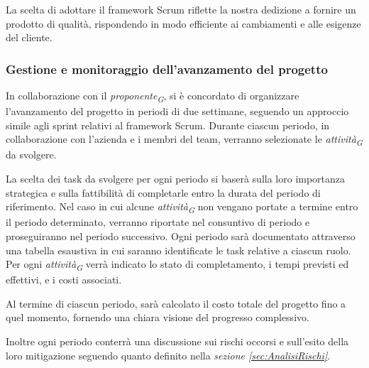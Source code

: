 La scelta di adottare il framework Scrum riflette la nostra dedizione a fornire un prodotto di qualità, rispondendo in modo efficiente ai cambiamenti e alle esigenze del cliente.

\pagebreak

\subsubsection{Gestione e monitoraggio dell'avanzamento del progetto}
In collaborazione con il \textit{proponente}\textsubscript{\textit{G}}, si è concordato di organizzare l'avanzamento del progetto in periodi di due settimane, seguendo un approccio simile agli sprint relativi al framework Scrum. Durante ciascun periodo, in collaborazione con l'azienda e i membri del team, verranno selezionate le \textit{attività}\textsubscript{\textit{G}} da svolgere.

\vspace{0.2cm}

La scelta dei task da svolgere per ogni periodo si baserà sulla loro importanza strategica e sulla fattibilità di completarle entro la durata del periodo di riferimento. Nel caso in cui alcune \textit{attività}\textsubscript{\textit{G}} non vengano portate a termine entro il periodo determinato, verranno riportate nel consuntivo di periodo e proseguiranno nel periodo successivo.
Ogni periodo sarà documentato attraverso una tabella esaustiva in cui saranno identificate le task relative a ciascun ruolo. Per ogni \textit{attività}\textsubscript{\textit{G}} verrà indicato lo stato di completamento, i tempi previsti ed effettivi, e i costi associati.

\vspace{0.2cm}



Al termine di ciascun periodo, sarà calcolato il costo totale del progetto fino a quel momento, fornendo una chiara visione del progresso complessivo.

Inoltre ogni periodo conterrà una discussione sui rischi occorsi e sull'esito della loro mitigazione seguendo quanto definito nella \textit{sezione \ref{sec:AnalisiRischi}}.

